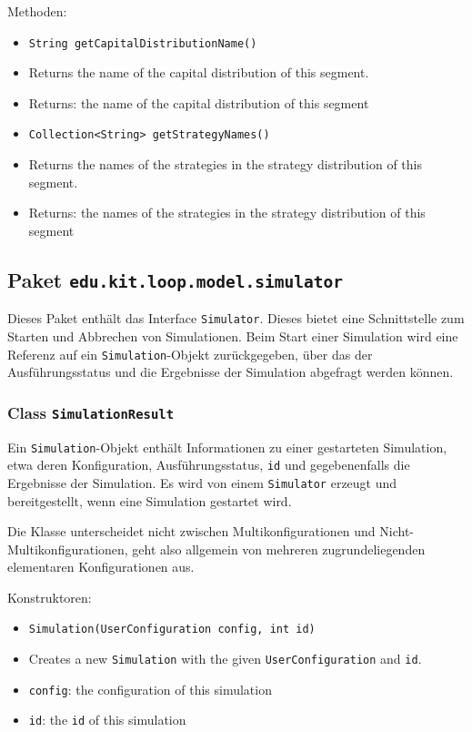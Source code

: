 \documentclass[parskip=full,11pt]{scrartcl}
\begin{document}
Methoden:
\begin{itemize}\itemsep -10pt
\item \texttt{String getCapitalDistributionName()}
\item[] Returns the name of the capital distribution of this segment.
\item[] Returns: the name of the capital distribution of this segment

\item \texttt{Collection<String> getStrategyNames()}
\item[] Returns the names of the strategies in the strategy distribution of this segment.
\item[] Returns: the names of the strategies in the strategy distribution of this segment
\end{itemize}


\subsection{Paket \texttt{edu.kit.loop.model.simulator}}
Dieses Paket enthält das Interface \texttt{Simulator}. Dieses bietet eine Schnittstelle zum Starten und Abbrechen von Simulationen. Beim Start einer Simulation wird eine Referenz auf ein \texttt{Simulation}-Objekt zurückgegeben, über das der Ausführungsstatus und die Ergebnisse der Simulation abgefragt werden können.

\subsubsection{Class \texttt{SimulationResult}}
Ein \texttt{Simulation}-Objekt enthält Informationen zu einer gestarteten Simulation, etwa deren Konfiguration, Ausführungsstatus, \texttt{id} und gegebenenfalls die Ergebnisse der Simulation. Es wird von einem \texttt{Simulator} erzeugt und bereitgestellt, wenn eine Simulation gestartet wird.

Die Klasse unterscheidet nicht zwischen Multikonfigurationen und Nicht-Multikonfigurationen, geht also allgemein von mehreren zugrundeliegenden elementaren Konfigurationen aus.

Konstruktoren:
\begin{itemize} \itemsep -10pt
\item \texttt{Simulation(UserConfiguration config, int id)}
\item[] Creates a new \texttt{Simulation} with the given \texttt{UserConfiguration} and \texttt{id}.
\item[] \texttt{config}: the configuration of this simulation
\item[] \texttt{id}: the \texttt{id} of this simulation
\end{itemize}
\end{document}

